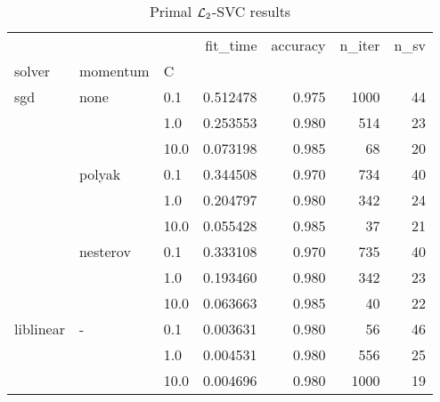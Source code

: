 \begin{table}[H]
\centering
\caption{Primal $\protect \mathcal{L}_2$-SVC results}
\label{primal_l2_svc_cv_results}
\begin{tabular}{lllrrrr}
\toprule
          &   &      &  fit\_time &  accuracy &  n\_iter &  n\_sv \\
solver & momentum & C &           &           &         &       \\
\midrule
sgd & none & 0.1  &  0.512478 &     0.975 &    1000 &    44 \\
          &   & 1.0  &  0.253553 &     0.980 &     514 &    23 \\
          &   & 10.0 &  0.073198 &     0.985 &      68 &    20 \\
          & polyak & 0.1  &  0.344508 &     0.970 &     734 &    40 \\
          &   & 1.0  &  0.204797 &     0.980 &     342 &    24 \\
          &   & 10.0 &  0.055428 &     0.985 &      37 &    21 \\
          & nesterov & 0.1  &  0.333108 &     0.970 &     735 &    40 \\
          &   & 1.0  &  0.193460 &     0.980 &     342 &    23 \\
          &   & 10.0 &  0.063663 &     0.985 &      40 &    22 \\
liblinear & - & 0.1  &  0.003631 &     0.980 &      56 &    46 \\
          &   & 1.0  &  0.004531 &     0.980 &     556 &    25 \\
          &   & 10.0 &  0.004696 &     0.980 &    1000 &    19 \\
\bottomrule
\end{tabular}
\end{table}

